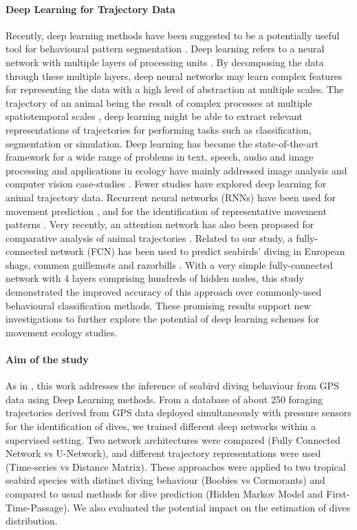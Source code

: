 \documentclass{article}
\begin{document}
\paragraph{Deep Learning for Trajectory Data}
Recently, deep learning methods have been suggested to be a potentially useful tool for behavioural pattern segmentation \citep{valletta_applications_2017}.
Deep learning refers to a neural network with multiple layers of processing units \citep{lecun_deep_2015}.
By decomposing the data through these multiple layers, deep neural networks may learn complex features for representing the data with a high level of abstraction at multiple scales.
The trajectory of an animal being the result of complex processes at multiple spatiotemporal scales \citep{nathan_movement_2008}, deep learning might be able to extract relevant representations of trajectories for performing tasks such as classification, segmentation or simulation.
Deep learning has become the state-of-the-art framework for a wide range of problems in text, speech, audio and image processing and applications in ecology have mainly addressed image analysis and computer vision case-studies \citep{weinstein_computer_2018, christin_applications_2019}.
Fewer studies have explored deep learning for animal trajectory data.
Recurrent neural networks (RNNs) have been used for movement prediction \citep{ardakani_encoding_2017,rew_animal_2019}, and for the identification of representative movement patterns \citep{peng_deep_2019}. Very recently, an attention network has also been proposed for comparative analysis of  animal trajectories
\citep{maekawa_deep_2020}.
Related to our study, a fully-connected network (FCN) has been used to predict seabirds' diving in European shags, common guillemots and razorbills  \citep{browning_predicting_2018}. With a very simple fully-connected network with 4 layers comprising hundreds of hidden nodes, this study demonstrated the improved accuracy of this approach over commonly-used behavioural classification methods. These promising results support new investigations to further explore the potential of deep learning schemes for movement ecology studies.

\paragraph{Aim of the study}
 As in \citep{browning_predicting_2018}, this work addresses the inference of seabird diving behaviour from GPS data using Deep Learning methods. From a database of about 250 foraging trajectories derived from GPS data deployed simultaneously with pressure sensors for the identification of dives, we trained different deep networks within a supervised setting. Two network architectures were compared (Fully Connected Network vs U-Network), and different trajectory representations were used (Time-series vs Distance Matrix). These approaches were applied to two tropical seabird species with distinct diving behaviour (Boobies vs Cormorants) and compared to usual methods for dive prediction (Hidden Markov Model and First-Time-Passage). We also evaluated the potential impact on the estimation of dives distribution.
\end{document}
